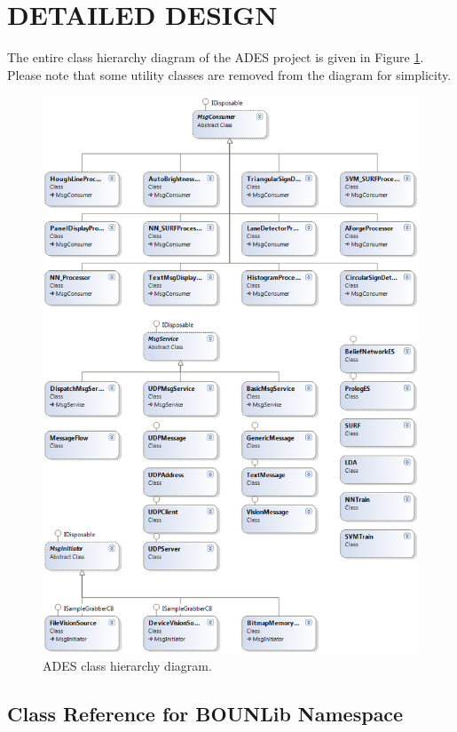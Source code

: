 \documentclass[a4paper,oneside,12pt]{report}
\begin{document}
\section{DETAILED DESIGN}
The entire class hierarchy diagram of the ADES project is given in Figure \ref{fig:cdapp}. Please note that some utility classes are removed from the diagram for simplicity.
\begin{figure}
\begin{center}
\includegraphics[width=140mm]{img/cdapp.eps}
\caption{ADES class hierarchy diagram.}
\label{fig:cdapp}
\end{center}
\end{figure}

\subsection{Class Reference for BOUNLib Namespace}
\end{document}
